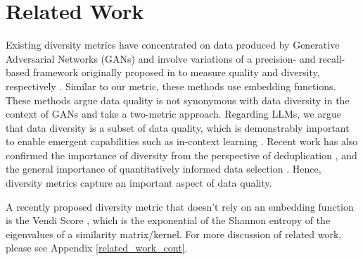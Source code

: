 \section{Related Work}
Existing diversity metrics have concentrated on data produced by Generative Adversarial Networks (GANs) and involve variations of a precision- and recall-based framework originally proposed in \citep{sajjadi2018assessing} to measure quality and diversity, respectively \citep{kynkaanniemi2019improved, simon2019revisiting, naeem2020}. 
Similar to our metric, these methods use embedding functions. 
These methods argue data quality is not synonymous with data diversity in the context of GANs \citep{fowl2020random} and take a two-metric approach.
Regarding LLMs, we argue that data diversity is a subset of data quality, which is demonstrably important to enable emergent capabilities such as in-context learning \cite{xie2022explanation, shin2022effect, chan2022data}. Recent work has also confirmed the importance of diversity from the perspective of deduplication \citep{tirumala2023d4}, and the general importance of quantitatively informed data selection \citep{xie2023doremi}.
Hence, diversity metrics capture an important aspect of data quality.
 
A recently proposed diversity metric that doesn't rely on an embedding function is the Vendi Score \citep{friedman2022vendi}, which is the exponential of the Shannon entropy of the eigenvalues of a similarity matrix/kernel. For more discussion of related work, please see Appendix \ref{related_work_cont}.


